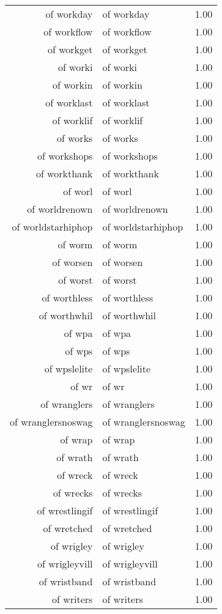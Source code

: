 \begin{table}[ht]
\begin{tabular}{rlr}
  of workday & of workday & 1.00 \\ 
  of workflow & of workflow & 1.00 \\ 
  of workget & of workget & 1.00 \\ 
  of worki & of worki & 1.00 \\ 
  of workin & of workin & 1.00 \\ 
  of worklast & of worklast & 1.00 \\ 
  of worklif & of worklif & 1.00 \\ 
  of works & of works & 1.00 \\ 
  of workshops & of workshops & 1.00 \\ 
  of workthank & of workthank & 1.00 \\ 
  of worl & of worl & 1.00 \\ 
  of worldrenown & of worldrenown & 1.00 \\ 
  of worldstarhiphop & of worldstarhiphop & 1.00 \\ 
  of worm & of worm & 1.00 \\ 
  of worsen & of worsen & 1.00 \\ 
  of worst & of worst & 1.00 \\ 
  of worthless & of worthless & 1.00 \\ 
  of worthwhil & of worthwhil & 1.00 \\ 
  of wpa & of wpa & 1.00 \\ 
  of wps & of wps & 1.00 \\ 
  of wpslelite & of wpslelite & 1.00 \\ 
  of wr & of wr & 1.00 \\ 
  of wranglers & of wranglers & 1.00 \\ 
  of wranglersnoswag & of wranglersnoswag & 1.00 \\ 
  of wrap & of wrap & 1.00 \\ 
  of wrath & of wrath & 1.00 \\ 
  of wreck & of wreck & 1.00 \\ 
  of wrecks & of wrecks & 1.00 \\ 
  of wrestlingif & of wrestlingif & 1.00 \\ 
  of wretched & of wretched & 1.00 \\ 
  of wrigley & of wrigley & 1.00 \\ 
  of wrigleyvill & of wrigleyvill & 1.00 \\ 
  of wristband & of wristband & 1.00 \\ 
  of writers & of writers & 1.00 \\ 

\end{tabular}
\end{table}
